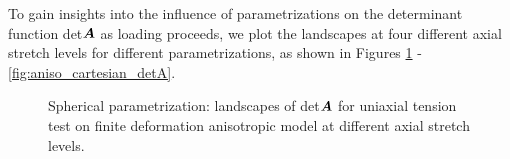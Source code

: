\documentclass[12pt]{article}
\numberwithin{equation}{section}
\begin{document}
To gain insights into the influence of parametrizations on the 
determinant function det${\boldsymbol{A}}$ as loading proceeds, we plot the 
landscapes at four different axial stretch levels for different 
parametrizations, as shown in Figures \ref{fig:aniso_spherical_detA} - 
\ref{fig:aniso_cartesian_detA}.

\begin{figure}[H]
   \centering {}   
   \caption{Spherical parametrization: landscapes of det${\boldsymbol{A}}$ 
   for uniaxial tension test on finite deformation anisotropic model at
   different axial stretch levels.}
   \label{fig:aniso_spherical_detA}
 \end{figure}
\end{document}

